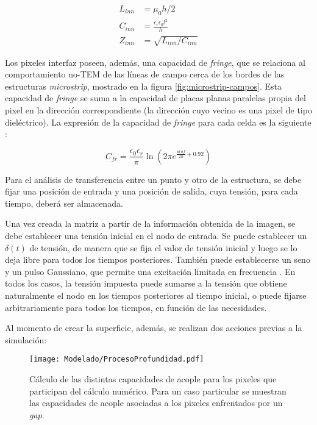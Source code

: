 \begin{align}
L_{inn} &= \mu_0 h /2 \\
C_{inn} &= \frac{\epsilon_r \epsilon_0 l^2}{h} \\
Z_{inn} &= \sqrt{L_{inn} / C_{inn}}
\end{align}

Los pixeles interfaz poseen, además, una capacidad de \textit{fringe}, que se relaciona al comportamiento no-TEM de las líneas de campo cerca de los bordes de las estructuras \textit{microstrip}, mostrado en la figura \ref{fig:microstrip-campos}. Esta capacidad de \textit{fringe} se suma a la capacidad de placas planas paralelas propia del pixel en la dirección correspondiente (la dirección cuyo vecino es una pixel de tipo dieléctrico). La expresión de la capacidad de \textit{fringe} para cada celda es la siguiente \cite{ThummWiesbeck:CharacteristicImpedance}:

\begin{equation}
	C_{fr} = \frac{\epsilon_0 \epsilon_r} {\pi} \ln (2 \pi e^{\frac{prof}{2 h} + 0.92})
\end{equation}

Para el análisis de transferencia entre un punto y otro de la estructura, se debe fijar una posición de entrada y una posición de salida, cuya tensión, para cada tiempo, deberá ser almacenada.

Una vez creada la matriz a partir de la información obtenida de la imagen, se debe establecer una tensión inicial en el nodo de entrada. Se puede establecer un $\delta(t)$ de tensión, de manera que se fija el valor de tensión inicial y luego se lo deja libre para todos los tiempos posteriores. También puede establecerse un seno y un pulso Gaussiano, que permite una excitación limitada en frecuencia \cite{Barthia:Handbook}. En todos los casos, la tensión impuesta puede sumarse a la tensión que obtiene naturalmente el nodo en los tiempos posteriores al tiempo inicial, o puede fijarse arbitrariamente para todos los tiempos, en función de las necesidades. 

Al momento de crear la superficie, además, se realizan dos acciones previas a la simulación:
\begin{figure}[h]
	\centering
	\texttt{[image: Modelado/ProcesoProfundidad.pdf]}
	\caption{Cálculo de las distintas capacidades de acople para los pixeles que participan del cálculo numérico. Para un caso particular se muestran las capacidades de acople asociadas a los pixeles enfrentados por un \textit{gap}.}
	\label{fig:calculoCapacidadTLM}
\end{figure}

